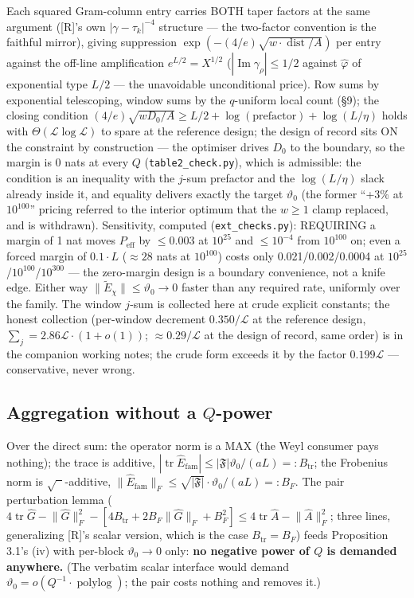 \documentclass[11pt]{amsart}
\newcommand{\im}{\operatorname{Im}}
\newcommand{\tr}{\operatorname{tr}}
\theoremstyle{plain}
\theoremstyle{remark}
\begin{document}
Each squared Gram-column entry carries BOTH taper factors at the same argument
([R]'s own $|\gamma - \tau_k|^{-4}$ structure --- the two-factor convention is the
faithful mirror), giving suppression $\exp(-(4/e)\sqrt{w\cdot\operatorname{dist}/A})$
per entry against the off-line amplification $e^{L/2} = X^{1/2}$
($|\im \gamma_\rho| \le 1/2$ against $\widehat{\varphi}$ of exponential type $L/2$
--- the unavoidable unconditional price). Row sums by exponential telescoping, window
sums by the $q$-uniform local count (\S9); the closing condition
$(4/e)\sqrt{wD_0/A} \ge L/2 + \log(\text{prefactor}) + \log(L/\eta)$ holds with
$\Theta(\mathcal{L} \log \mathcal{L})$ to spare at the reference design; the design
of record sits ON the constraint by construction --- the optimiser drives $D_0$ to
the boundary, so the margin is 0 nats at every $Q$ (\texttt{table2\_check.py}), which
is admissible: the condition is an inequality with the $j$-sum prefactor and the
$\log(L/\eta)$ slack already inside it, and equality delivers exactly the target
$\vartheta_0$ (the former ``+3\% at $10^{100}$'' pricing referred to the interior
optimum that the $w \ge 1$ clamp replaced, and is withdrawn). Sensitivity, computed
(\texttt{ext\_checks.py}): REQUIRING a margin of 1 nat moves $P_{\mathrm{eff}}$ by
$\le 0.003$ at $10^{25}$ and $\le 10^{-4}$ from $10^{100}$ on; even a forced margin
of $0.1\cdot L$ ($\approx 28$ nats at $10^{100}$) costs only 0.021/0.002/0.0004 at
$10^{25}$/$10^{100}$/$10^{300}$ --- the zero-margin design is a boundary convenience,
not a knife edge. Either way $\lVert\widetilde{E}_\chi\rVert \le \vartheta_0 \to 0$
faster than any required rate, uniformly over the family. The window $j$-sum is
collected here at crude explicit constants; the honest collection (per-window
decrement $0.350/\mathcal{L}$ at the reference design,
$\sum_j = 2.86\mathcal{L}\cdot(1 + o(1))$; $\approx 0.29/\mathcal{L}$ at the design
of record, same order) is in the companion working notes; the crude form exceeds it
by the factor $0.199\mathcal{L}$ --- conservative, never wrong.

\subsection{Aggregation without a $Q$-power}

Over the direct sum: the operator norm is a MAX (the Weyl consumer pays nothing); the
trace is additive,
$|\tr \widehat{E}_{\mathrm{fam}}| \le |\mathfrak{F}|\vartheta_0/(aL) =: B_{\mathrm{tr}}$;
the Frobenius norm is $\sqrt{\phantom{x}}$-additive,
$\lVert\widehat{E}_{\mathrm{fam}}\rVert_F \le \sqrt{|\mathfrak{F}|}\cdot\vartheta_0/(aL)
=: B_F$. The pair perturbation lemma
($4 \tr \widehat{G} - \lVert\widehat{G}\rVert^2_F - [4B_{\mathrm{tr}} +
2B_F\lVert\widehat{G}\rVert_F + B_F^2] \le 4 \tr \widehat{A} -
\lVert\widehat{A}\rVert^2_F$; three lines, generalizing [R]'s scalar version, which is
the case $B_{\mathrm{tr}} = B_F$) feeds Proposition 3.1's (iv) with per-block
$\vartheta_0 \to 0$ only: \textbf{no negative power of $Q$ is demanded anywhere.}
(The verbatim scalar interface would demand
$\vartheta_0 = o(Q^{-1}\cdot\operatorname{polylog})$; the pair costs nothing and
removes it.)
\end{document}
